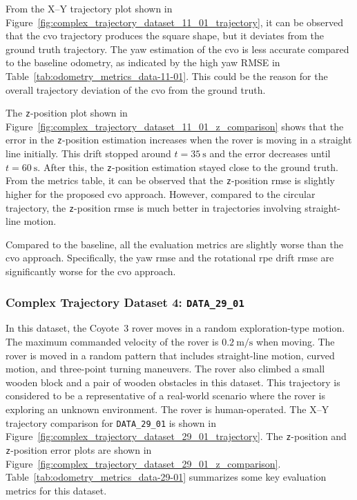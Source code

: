 \documentclass[report.tex]{subfiles}
\begin{document}
    From the X--Y trajectory plot shown in Figure~\ref{fig:complex_trajectory_dataset_11_01_trajectory}, it can be observed that the \gls{cvo} trajectory produces the square shape, but it deviates from the ground truth trajectory. The yaw estimation of the \gls{cvo} is less accurate compared to the baseline odometry, as indicated by the high yaw RMSE in Table~\ref{tab:odometry_metrics_data-11-01}. This could be the reason for the overall trajectory deviation of the \gls{cvo} from the ground truth. 

    The \texttt{z}-position plot shown in Figure~\ref{fig:complex_trajectory_dataset_11_01_z_comparison} shows that the error in the \texttt{z}-position estimation increases when the rover is moving in a straight line initially. This drift stopped around $t=35~\mathrm{s}$ and the error decreases until $t=60~\mathrm{s}$. After this, the \texttt{z}-position estimation stayed close to the ground truth. From the metrics table, it can be observed that the \texttt{z}-position \gls{rmse} is slightly higher for the proposed \gls{cvo} approach. However, compared to the circular trajectory, the \texttt{z}-position \gls{rmse} is much better in trajectories involving straight-line motion.
    
    Compared to the baseline, all the evaluation metrics are slightly worse than the \gls{cvo} approach. Specifically, the yaw \gls{rmse} and the rotational \gls{rpe} drift \gls{rmse} are significantly worse for the \gls{cvo} approach. 
    
    
    \FloatBarrier

    \subsubsection{Complex Trajectory Dataset 4: \texttt{DATA\_29\_01}} \label{subsubsec:complexTrajectoryD4_29_01}

    In this dataset, the Coyote~3 rover moves in a random exploration-type motion. The maximum commanded velocity of the rover is $0.2~\mathrm{m/s}$ when moving. The rover is moved in a random pattern that includes straight-line motion, curved motion, and three-point turning maneuvers. The rover also climbed a small wooden block and a pair of wooden obstacles in this dataset. This trajectory is considered to be a representative of a real-world scenario where the rover is exploring an unknown environment. The rover is human-operated. The X--Y trajectory comparison for \texttt{DATA\_29\_01} is shown in Figure~\ref{fig:complex_trajectory_dataset_29_01_trajectory}. The \texttt{z}-position and \texttt{z}-position error plots are shown in Figure~\ref{fig:complex_trajectory_dataset_29_01_z_comparison}. Table~\ref{tab:odometry_metrics_data-29-01} summarizes some key evaluation metrics for this dataset.
    
\end{document}
